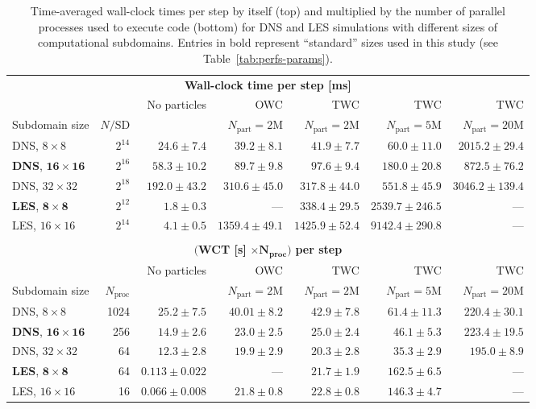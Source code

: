 \documentclass{pracamgren}
\begin{document}
\begin{table}[ht]
\centering
\scriptsize
\begin{tabular}{lrrrrrr}
\multicolumn{7}{c}{\textbf{Wall-clock time per step [ms]}} \\
 & & No particles & OWC & TWC & TWC & TWC \\ 
Subdomain size & $N / \text{SD}$ &  & $N_{\text{part}} = 2 \text{M}$ & $N_{\text{part}} = 2 \text{M}$ & $N_{\text{part}} = 5 \text{M}$ & $N_{\text{part}} = 20 \text{M}$ \\ \hline

DNS, $8 \times 8$ & $2^{14}$ & $24.6 \pm 7.4$ & $39.2 \pm 8.1$ & $41.9 \pm 7.7$ & $60.0 \pm 11.0$ & $2015.2 \pm 29.4$ \\
\textbf{DNS}, $\mathbf{16 \times 16}$ & $2^{16}$ & $58.3 \pm 10.2$ & $89.7 \pm 9.8$ & $97.6 \pm 9.4$ & $180.0 \pm 20.8$ & $872.5 \pm 76.2$ \\
DNS, $32 \times 32$ & $2^{18}$ & $192.0 \pm 43.2$ & $310.6 \pm 45.0$ & $317.8 \pm 44.0$ & $551.8 \pm 45.9$ & $3046.2 \pm 139.4$ \\ \hline
\textbf{LES}, $\mathbf{8 \times 8}$ & $2^{12}$ & $1.8 \pm 0.3$ & --- & $338.4 \pm 29.5$ & $2539.7 \pm 246.5$ & --- \\
LES, $16 \times 16$ & $2^{14}$ & $4.1 \pm 0.5$ & $1359.4 \pm 49.1$ & $1425.9 \pm 52.4$ & $9142.4 \pm 290.8$ & --- \\ \hline \hline
 & & & & & & \\
\multicolumn{7}{c}{$\mathbf{(}$\textbf{WCT [s]} $\mathbf{\times N_{\text{proc}})}$ \textbf{per step}} \\
 & & No particles & OWC & TWC & TWC & TWC \\ 
Subdomain size & $N_{\text{proc}}$ &  & $N_{\text{part}} = 2 \text{M}$ & $N_{\text{part}} = 2 \text{M}$ & $N_{\text{part}} = 5 \text{M}$ & $N_{\text{part}} = 20 \text{M}$ \\ \hline

DNS, $8 \times 8$ & 1024 & $25.2 \pm 7.5$ & $40.01 \pm 8.2$ & $42.9 \pm 7.8$ & $61.4 \pm 11.3$ & $220.4 \pm 30.1$ \\
\textbf{DNS}, $\mathbf{16 \times 16}$ & 256 & $14.9 \pm 2.6$ & $23.0 \pm 2.5$ & $25.0 \pm 2.4$ & $46.1 \pm 5.3$ & $223.4 \pm 19.5$ \\
DNS, $32 \times 32$ & 64 & $12.3 \pm 2.8$ & $19.9 \pm 2.9$ & $20.3 \pm 2.8$ & $35.3 \pm 2.9$ & $195.0 \pm 8.9$ \\ \hline
\textbf{LES}, $\mathbf{8 \times 8}$ & 64 & $0.113 \pm 0.022$ & --- & $21.7 \pm 1.9$ & $162.5 \pm 6.5$ & --- \\
LES, $16 \times 16$ & 16 & $0.066 \pm 0.008$ & $21.8 \pm 0.8$ & $22.8 \pm 0.8$ & $146.3 \pm 4.7$ & --- \\ \hline \hline
\end{tabular}
\caption{Time-averaged wall-clock times per step by itself (top) and multiplied by the number of parallel processes used to execute code (bottom) for DNS and LES simulations with different sizes of computational subdomains.
Entries in bold represent ``standard'' sizes used in this study (see Table~\ref{tab:perfs-params}).
}
\label{tab:perfs-pfg}
\end{table}
\end{document}

